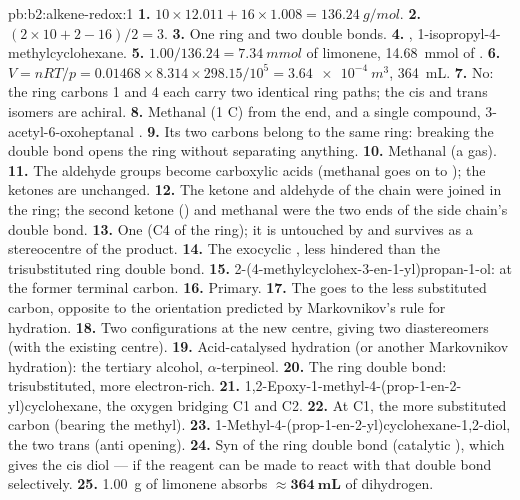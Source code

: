\begin{solution}{pb:b2:alkene-redox:1}
\textbf{1.} $10 \times 12.011 + 16 \times 1.008 = \qty{136.24}{g/mol}$.
\textbf{2.} $(2 \times 10 + 2 - 16)/2 = 3$.
\textbf{3.} One ring and two double bonds.
\textbf{4.} , 1-isopropyl-4-methylcyclohexane.
\textbf{5.} $1.00/136.24 = \qty{7.34}{mmol}$ of limonene, \qty{14.68}{mmol} of .
\textbf{6.} $V = nRT/p = 0.01468 \times 8.314 \times 298.15/10^5 = \qty{3.64e-4}{m^3}$,
\qty{364}{mL}.
\textbf{7.} No: the ring carbons 1 and 4 each carry two identical ring paths; the cis and
trans isomers are achiral.
\textbf{8.} Methanal  (1 C) from the  end, and a single  compound,
3-acetyl-6-oxoheptanal .
\textbf{9.} Its two carbons belong to the same ring: breaking the double bond opens the ring
without separating anything.
\textbf{10.} Methanal (a gas).
\textbf{11.} The aldehyde groups become carboxylic acids (methanal goes on to ); the
ketones are unchanged.
\textbf{12.} The ketone and aldehyde of the  chain were joined in the ring; the second
ketone () and methanal were the two ends of the side chain's double bond.
\textbf{13.} One (C4 of the ring); it is untouched by  and survives as a
stereocentre of the  product.
\textbf{14.} The exocyclic , less hindered than the trisubstituted ring double bond.
\textbf{15.} 2-(4-methylcyclohex-3-en-1-yl)propan-1-ol:  at the former terminal
carbon.
\textbf{16.} Primary.
\textbf{17.} The  goes to the less substituted carbon, opposite to the orientation
predicted by Markovnikov's rule for hydration.
\textbf{18.} Two configurations at the new centre, giving two diastereomers (with the existing
centre).
\textbf{19.} Acid-catalysed hydration (or another Markovnikov hydration): the tertiary alcohol,
$\alpha$-terpineol.
\textbf{20.} The ring double bond: trisubstituted, more electron-rich.
\textbf{21.} 1,2-Epoxy-1-methyl-4-(prop-1-en-2-yl)cyclohexane, the oxygen bridging C1 and C2.
\textbf{22.} At C1, the more substituted carbon (bearing the methyl).
\textbf{23.} 1-Methyl-4-(prop-1-en-2-yl)cyclohexane-1,2-diol, the two  trans (anti
opening).
\textbf{24.} Syn  of the ring double bond (catalytic ), which gives the cis
diol --- if the reagent can be made to react with that double bond selectively.
\textbf{25.} \qty{1.00}{g} of limonene absorbs $\boldsymbol{\approx \qty{364}{mL}}$ of
dihydrogen.
\end{solution}
